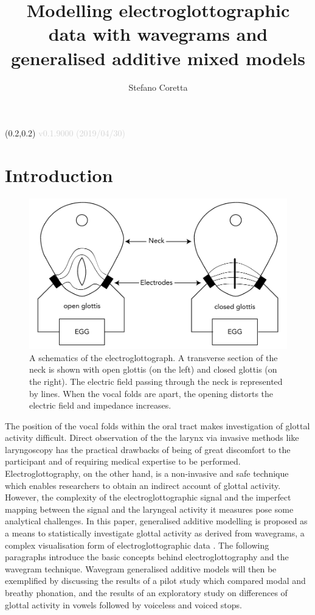 \documentclass[
  11pt,
  a4paper,
]{article}
\title{Modelling electroglottographic data with wavegrams and generalised
additive mixed models}
\author{Stefano Coretta}
\date{}
\begin{document}
\begin{textblock}{3}(0.2,0.2)
  \textcolor{lightgray}{v0.1.9000 (2019/04/30)}
\end{textblock}
\maketitle

\hypertarget{introduction}{%
\section{Introduction}\label{introduction}}

\begin{figure}
  \centering
  \includegraphics{./img/egg-setup.pdf}
  \caption{A schematics of the electroglottograph. A transverse section of the neck is shown with open glottis (on the left) and closed glottis (on the right). The electric field passing through the neck is represented by lines. When the vocal folds are apart, the opening distorts the electric field and impedance increases.}
  \label{f:egg-setup}
\end{figure}

The position of the vocal folds within the oral tract makes
investigation of glottal activity difficult. Direct observation of the
the larynx via invasive methods like laryngoscopy has the practical
drawbacks of being of great discomfort to the participant and of
requiring medical expertise to be performed. Electroglottography, on the
other hand, is a non-invasive and safe technique which enables
researchers to obtain an indirect account of glottal activity. However,
the complexity of the electroglottographic signal and the imperfect
mapping between the signal and the laryngeal activity it measures pose
some analytical challenges. In this paper, generalised additive
modelling \citealt{hastie1986} is proposed as a means to statistically
investigate glottal activity as derived from wavegrams, a complex
visualisation form of electroglottographic data \citet{herbst2010}. The
following paragraphs introduce the basic concepts behind
electroglottography and the wavegram technique. Wavegram generalised
additive models will then be exemplified by discussing the results of a
pilot study which compared modal and breathy phonation, and the results
of an exploratory study on differences of glottal activity in vowels
followed by voiceless and voiced stops.
\end{document}

